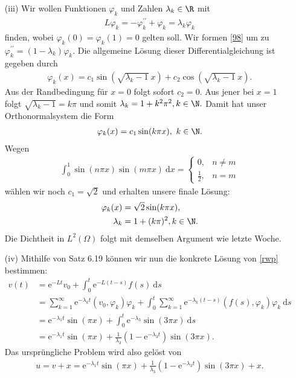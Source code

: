 \begin{solution}
\begin{itemize}
    \item[(iii)] Wir wollen Funktionen $\varphi_k$ und Zahlen $\lambda_k \in \R$ mit
    \begin{align}\label{98}
        L\varphi_k = - \varphi_k^{\prime\prime} + \varphi_k = \lambda_k\varphi_k
    \end{align}
    finden, wobei $\varphi_k(0) = \varphi_k(1) = 0$ gelten soll.
    Wir formen \eqref{98} um zu $\varphi_k^{\prime\prime} = (1 - \lambda_k) \varphi_k$.
    Die allgemeine Lösung dieser Differentialgleichung ist gegeben durch
    \begin{align*}
        \varphi_k(x) = c_1 \sin(\sqrt{\lambda_k - 1}~ x) + c_2 \cos(\sqrt{\lambda_k - 1}~ x).
    \end{align*}
    Aus der Randbedingung für $x = 0$ folgt sofort $c_2 = 0.$ Aus jener bei $x = 1$ folgt $\sqrt{\lambda_k - 1} = k\pi$ und somit $\lambda_k = 1 + k^2\pi^2, k \in \N.$
    Damit hat unser Orthonormalsystem die Form
    \begin{align*}
        \varphi_k(x) = c_1 \sin(k\pi x),~ k \in \N.
    \end{align*}
    Wegen
    \begin{align*}
        \int_0^1 \sin(n\pi x) \sin(m\pi x) \mathrm{~d}x =
        \begin{cases}
            0, & n \neq m\\
            \frac{1}{2}, & n = m
        \end{cases}
    \end{align*}
    wählen wir noch $c_1 = \sqrt 2$ und erhalten unsere finale Lösung:
    \begin{align}
        \varphi_k(x) &= \sqrt 2 \sin(k\pi x),\\
        \lambda_k &= 1 + (k\pi)^2, k \in \N.
    \end{align}
    Die Dichtheit in $L^2(\Omega)$ folgt mit demselben Argument wie letzte Woche.
    \item[(iv)] Mithilfe von Satz 6.19 können wir nun die konkrete Lösung von \eqref{rwp} bestimmen:
    \begin{align*}
        v(t) &= \mathrm{e}^{-Lt}v_0 + \int_0^t \mathrm{e}^{-L(t-s)} f(s) \mathrm{~d} s\\
        &= \sum_{k = 1}^\infty \mathrm{e}^{-\lambda_k t}(v_0, \varphi_k) \varphi_k + \int_0^t \sum_{k = 1}^\infty \mathrm{e}^{-\lambda_k (t-s)}(f(s), \varphi_k) \varphi_k \mathrm{~d} s\\
        &= \mathrm{e}^{-\lambda_1 t} \sin(\pi x) + \int_0^t \mathrm{e}^{-\lambda_3} \sin(3\pi x) \mathrm{~d} s \\
        &= \mathrm{e}^{-\lambda_1 t} \sin(\pi x) + \frac{1}{\lambda_3} (1 - \mathrm{e}^{-\lambda_3 t}) \sin(3\pi x).
    \end{align*}
    Das ursprüngliche Problem wird also gelöst von
    \begin{align*}
        u = v + x = \mathrm{e}^{-\lambda_1 t} \sin(\pi x) + \frac{1}{\lambda_3} (1 - \mathrm{e}^{-\lambda_3 t}) \sin(3\pi x) + x.
    \end{align*}
    \end{itemize}


\end{solution}


